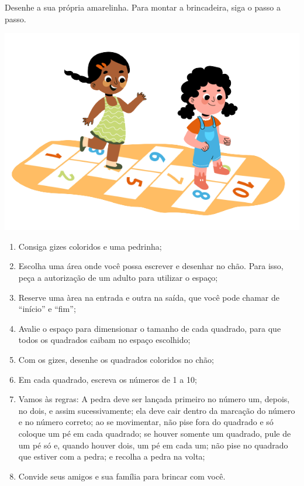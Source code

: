 \begin{myquote}
Desenhe a sua própria amarelinha. Para montar a brincadeira, siga o
passo a passo.

\begin{center}
\includegraphics[width=.6\textwidth]{media/image45.png}
\end{center}

\begin{enumerate}
\item Consiga gizes coloridos e uma pedrinha;

\item Escolha uma área onde você possa escrever e desenhar no chão. Para isso, peça a autorização de um adulto para utilizar o espaço; 

\item Reserve uma àrea na entrada e outra na saída, que você pode chamar de ``início'' e ``fim'';

\item Avalie o espaço para dimensionar o tamanho de cada quadrado, para que todos os quadrados caibam no espaço escolhido;

\item Com os gizes, desenhe os quadrados coloridos no chão;

\item Em cada quadrado, escreva os números de 1 a 10;

\item Vamos às regras: A pedra deve ser lançada primeiro no número um, 
depois, no dois, e assim sucessivamente; ela deve cair dentro da marcação 
do número e no número correto; ao se movimentar, não pise fora do quadrado 
e só coloque um pé em cada quadrado; se houver somente um quadrado, 
pule de um pé só e, quando houver dois, um pé em cada um; 
não pise no quadrado que estiver com a pedra; e recolha a pedra na volta;

\item Convide seus amigos e sua família para brincar com você.
\end{enumerate}

\end{myquote}

